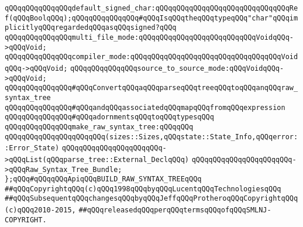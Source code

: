 \verb|qQQqqQQqqQQqqQQqdefault_signed_char:qQQqqQQqqQQqqQQqqQQqqQQqqQQqqQQqRef(qQQqBoolqQQq);qQQqqQQqqQQqqQQq#qQQqIsqQQqtheqQQqtypeqQQq"char"qQQqimplicitlyqQQqregardedqQQqasqQQqsigned?qQQq|\newline
\newline
\newline
\newline
\verb|qQQqqQQqqQQqqQQqmulti_file_mode:qQQqqQQqqQQqqQQqqQQqqQQqqQQqVoidqQQq->qQQqVoid;|\newline
\verb|qQQqqQQqqQQqqQQqcompiler_mode:qQQqqQQqqQQqqQQqqQQqqQQqqQQqqQQqqQQqVoidqQQq->qQQqVoid;|\newline
\verb|qQQqqQQqqQQqqQQqsource_to_source_mode:qQQqVoidqQQq->qQQqVoid;|\newline
\newline
\verb|qQQqqQQqqQQqqQQq#qQQqConvertqQQqaqQQqparseqQQqtreeqQQqtoqQQqanqQQqraw_syntax_tree|\newline
\verb|qQQqqQQqqQQqqQQq#qQQqandqQQqassociatedqQQqmapqQQqfromqQQqexpression|\newline
\verb|qQQqqQQqqQQqqQQq#qQQqadornmentsqQQqtoqQQqtypesqQQq|\newline
\newline
\verb|qQQqqQQqqQQqqQQqmake_raw_syntax_tree:qQQqqQQq|\newline
\verb|qQQqqQQqqQQqqQQqqQQqqQQq(sizes::Sizes,qQQqstate::State_Info,qQQqerror::Error_State)|\newline
\verb|qQQqqQQqqQQqqQQqqQQqqQQq->qQQqList(qQQqparse_tree::External_DeclqQQq)|\newline
\verb|qQQqqQQqqQQqqQQqqQQqqQQq->qQQqRaw_Syntax_Tree_Bundle;|\newline
\newline
\verb|};qQQq#qQQqqQQqApiqQQqBUILD_RAW_SYNTAX_TREEqQQq|\newline
\newline
\newline
\verb|##qQQqCopyrightqQQq(c)qQQq1998qQQqbyqQQqLucentqQQqTechnologiesqQQq|\newline
\verb|##qQQqSubsequentqQQqchangesqQQqbyqQQqJeffqQQqProtheroqQQqCopyrightqQQq(c)qQQq2010-2015,|\newline
\verb|##qQQqreleasedqQQqperqQQqtermsqQQqofqQQqSMLNJ-COPYRIGHT.|\newline

